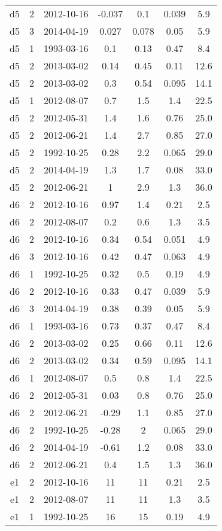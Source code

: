 \begin{table*}[htp]
\begin{tabular}{ccccccc}
d5 & 2 & 2012-10-16 & -0.037 & 0.1 & 0.039 & 5.9 \\
d5 & 3 & 2014-04-19 & 0.027 & 0.078 & 0.05 & 5.9 \\
d5 & 1 & 1993-03-16 & 0.1 & 0.13 & 0.47 & 8.4 \\
d5 & 2 & 2013-03-02 & 0.14 & 0.45 & 0.11 & 12.6 \\
d5 & 2 & 2013-03-02 & 0.3 & 0.54 & 0.095 & 14.1 \\
d5 & 1 & 2012-08-07 & 0.7 & 1.5 & 1.4 & 22.5 \\
d5 & 2 & 2012-05-31 & 1.4 & 1.6 & 0.76 & 25.0 \\
d5 & 2 & 2012-06-21 & 1.4 & 2.7 & 0.85 & 27.0 \\
d5 & 2 & 1992-10-25 & 0.28 & 2.2 & 0.065 & 29.0 \\
d5 & 2 & 2014-04-19 & 1.3 & 1.7 & 0.08 & 33.0 \\
d5 & 2 & 2012-06-21 & 1 & 2.9 & 1.3 & 36.0 \\
d6 & 2 & 2012-10-16 & 0.97 & 1.4 & 0.21 & 2.5 \\
d6 & 2 & 2012-08-07 & 0.2 & 0.6 & 1.3 & 3.5 \\
d6 & 2 & 2012-10-16 & 0.34 & 0.54 & 0.051 & 4.9 \\
d6 & 3 & 2012-10-16 & 0.42 & 0.47 & 0.063 & 4.9 \\
d6 & 1 & 1992-10-25 & 0.32 & 0.5 & 0.19 & 4.9 \\
d6 & 2 & 2012-10-16 & 0.33 & 0.47 & 0.039 & 5.9 \\
d6 & 3 & 2014-04-19 & 0.38 & 0.39 & 0.05 & 5.9 \\
d6 & 1 & 1993-03-16 & 0.73 & 0.37 & 0.47 & 8.4 \\
d6 & 2 & 2013-03-02 & 0.25 & 0.66 & 0.11 & 12.6 \\
d6 & 2 & 2013-03-02 & 0.34 & 0.59 & 0.095 & 14.1 \\
d6 & 1 & 2012-08-07 & 0.5 & 0.8 & 1.4 & 22.5 \\
d6 & 2 & 2012-05-31 & 0.03 & 0.8 & 0.76 & 25.0 \\
d6 & 2 & 2012-06-21 & -0.29 & 1.1 & 0.85 & 27.0 \\
d6 & 2 & 1992-10-25 & -0.28 & 2 & 0.065 & 29.0 \\
d6 & 2 & 2014-04-19 & -0.61 & 1.2 & 0.08 & 33.0 \\
d6 & 2 & 2012-06-21 & 0.4 & 1.5 & 1.3 & 36.0 \\
e1 & 2 & 2012-10-16 & 11 & 11 & 0.21 & 2.5 \\
e1 & 2 & 2012-08-07 & 11 & 11 & 1.3 & 3.5 \\
e1 & 1 & 1992-10-25 & 16 & 15 & 0.19 & 4.9 \\

\end{tabular}
\end{table*}
